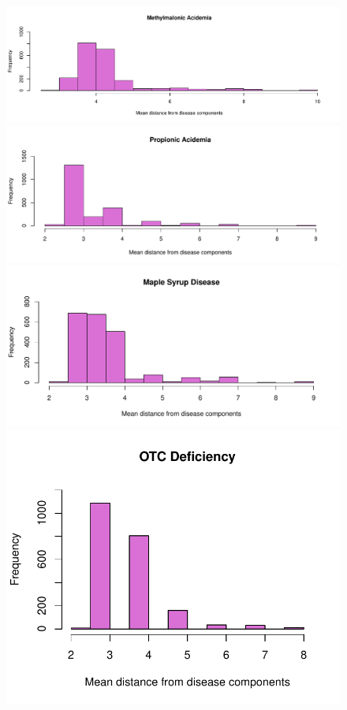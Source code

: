 \begin{figure}[h!]
    \includegraphics[scale=0.2]{Images/Methylmalonic Acidemia.pdf}
    \includegraphics[scale=0.2]{Images/Propionic Acidemia.pdf}
    \includegraphics[scale=0.2]{Images/Maple Syrup Disease.pdf}
    \includegraphics[scale=0.2]{Images/OTC Deficiency.pdf}

\end{figure}
